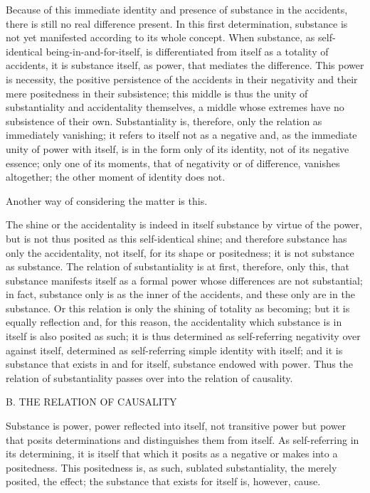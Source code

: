 Because of this immediate identity and presence
of substance in the accidents,
there is still no real difference present.
In this first determination, substance is not yet manifested
according to its whole concept.
When substance, as self-identical being-in-and-for-itself,
is differentiated from itself as a totality of accidents,
it is substance itself, as power, that mediates the difference.
This power is necessity, the positive persistence
of the accidents in their negativity
and their mere positedness in their subsistence;
this middle is thus the unity of
substantiality and accidentality themselves,
a middle whose extremes have no subsistence of their own.
Substantiality is, therefore, only the relation as immediately vanishing;
it refers to itself not as a negative
and, as the immediate unity of power with itself,
is in the form only of its identity,
not of its negative essence;
only one of its moments, that of negativity or of difference,
vanishes altogether;
the other moment of identity does not.

Another way of considering the matter is this.

The shine or the accidentality is indeed
in itself substance by virtue of the power,
but is not thus posited as this self-identical shine;
and therefore substance has only the accidentality,
not itself, for its shape or positedness;
it is not substance as substance.
The relation of substantiality is at first, therefore, only this,
that substance manifests itself as a formal power
whose differences are not substantial;
in fact, substance only is as the inner of the accidents,
and these only are in the substance.
Or this relation is only the shining of totality as becoming;
but it is equally reflection and, for this reason,
the accidentality which substance is in itself is also posited as such;
it is thus determined as self-referring negativity over against itself,
determined as self-referring simple identity with itself;
and it is substance that exists in and for itself,
substance endowed with power.
Thus the relation of substantiality passes over
into the relation of causality.

B. THE RELATION OF CAUSALITY

Substance is power, power reflected into itself,
not transitive power but power that posits determinations
and distinguishes them from itself.
As self-referring in its determining,
it is itself that which it posits as a negative
or makes into a positedness.
This positedness is, as such, sublated substantiality,
the merely posited, the effect;
the substance that exists for itself is, however, cause.

